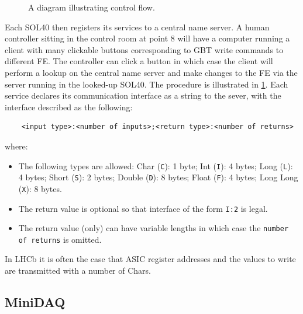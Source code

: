 \begin{figure}[!htb]
    \centering
    \hspace{0.2em}
    \resizebox{0.75\columnwidth}{!}{
        
    }
    \hspace{0.2em}
    \caption{
        A diagram illustrating \dim control flow.
    }
    \label{fig:dim-lhcb}
\end{figure}

Each SOL40 then registers its \dim services to a central name server.
A human controller sitting in the control room at point 8 will have a computer
running a \dim client with many clickable buttons corresponding to GBT write
commands to different FE.
The controller can click a button in which case the \dim client will perform
a lookup on the central name server and make changes to the FE via the
\dim server running in the looked-up SOL40.
The procedure is illustrated in \cref{fig:dim-lhcb}.
Each \dim service declares its communication interface as a string to the \dim
sever, with the interface described as the following:

\begin{lstlisting}
    <input type>:<number of inputs>;<return type>:<number of returns>
\end{lstlisting}
where:

\begin{itemize}
    \item The following types are allowed:
        Char (\lstinline{C}): 1 byte;
        Int (\lstinline{I}): 4 bytes;
        Long (\lstinline{L}): 4 bytes;
        Short (\lstinline{S}): 2 bytes;
        Double (\lstinline{D}): 8 bytes;
        Float (\lstinline{F}): 4 bytes;
        Long Long (\lstinline{X}): 8 bytes.
    \item The return value is optional so that interface of the form
        \lstinline{I:2} is legal.
    \item The return value (only) can have variable lengths in which case
        the \lstinline{number of returns} is omitted.
\end{itemize}

In LHCb it is often the case that ASIC register addresses and the values to
write are transmitted with a number of Chars.


\subsection{MiniDAQ}
\label{online-minidaq}

